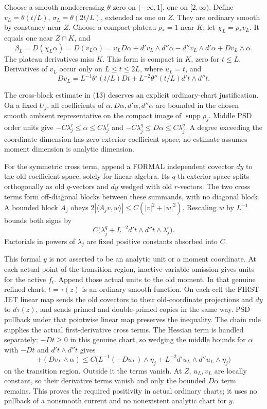 \documentclass[11pt]{article}
\begin{document}
Choose a smooth nondecreasing \(\theta\) zero on \(( -\infty,1]\), one on \([2,\infty)\). Define \(v_L=\theta(t/L)\), \(\sigma_L=\theta(2t/L)\), extended as one on \(Z\). They are ordinary smooth by constancy near \(Z\). Choose a compact plateau \(\rho_*=1\) near \(K\); let \(\chi_L=\rho_*v_L\). It equals one near \(Z\cap K\), and
\[
 \beta_L=D(\chi_L\alpha)=D(v_L\alpha)
 =v_LD\alpha+d'v_L\wedge d''\alpha-d''v_L\wedge d'\alpha
   +Dv_L\wedge\alpha.                                                   \tag{13}
\]
The plateau derivatives miss \(K\). This form is compact in \(K\), zero for \(t\leq L\). Derivatives of \(v_L\) occur only on \(L\leq t\leq2L\), where \(u_L=t\), and
\[
 Dv_L=L^{-1}\theta'(t/L)Dt+L^{-2}\theta''(t/L)d't\wedge d''t.
\]

The cross-block estimate in (13) deserves an explicit ordinary-chart justification. On a fixed \(U_j\), all coefficients of \(\alpha,D\alpha,d'\alpha,d''\alpha\) are bounded in the chosen smooth ambient representative on the compact image of \(\operatorname{supp}\rho_j\). Middle PSD order units give \(-C\lambda_j^r\leq\alpha\leq C\lambda_j^r\) and \(-C\lambda_j^q\leq D\alpha\leq C\lambda_j^q\). A degree exceeding the coordinate dimension has zero exterior coefficient space; no estimate assumes moment dimension is analytic dimension.

For the symmetric cross term, append a FORMAL independent covector \(dy\) to the old coefficient space, solely for linear algebra. Its \(q\)-th exterior space splits orthogonally as old \(q\)-vectors and \(dy\) wedged with old \(r\)-vectors. The two cross terms form off-diagonal blocks between these summands, with no diagonal block. A bounded block \(A_j\) obeys \(2|\langle A_jv,w\rangle|\leq C(|v|^2+|w|^2)\). Rescaling \(w\) by \(L^{-1}\) bounds both signs by
\[
 C\big(\lambda_j^q+L^{-2}d't\wedge d''t\wedge\lambda_j^r\big).
\]
Factorials in powers of \(\lambda_j\) are fixed positive constants absorbed into \(C\).

This formal \(y\) is not asserted to be an analytic unit or a moment coordinate. At each actual point of the transition region, inactive-variable omission gives units for the active \(f_i\). Append those actual units to the old moment. In that genuine refined chart, \(t=\tau(z)\) is an ordinary smooth function. On each cell the FIRST-JET linear map sends the old covectors to their old-coordinate projections and \(dy\) to \(d\tau(z)\), and sends primed and double-primed copies in the same way. PSD pullback under that pointwise linear map preserves the inequality. The chain rule supplies the actual first-derivative cross terms. The Hessian term is handled separately: \(-Dt\geq0\) in this genuine chart, so wedging the middle bounds for \(\alpha\) with \(-Dt\) and \(d't\wedge d''t\) gives
\[
 \pm(Dv_L\wedge\alpha)\leq
 C\big(L^{-1}(-Du_L)\wedge\eta_j
       +L^{-2}d'u_L\wedge d''u_L\wedge\eta_j\big)
\]
on the transition region. Outside it the terms vanish. At \(Z\), \(u_L,v_L\) are locally constant, so their derivative terms vanish and only the bounded \(D\alpha\) term remains. This proves the required positivity in actual ordinary charts; it uses no pullback of a nonsmooth current and no nonexistent analytic chart for \(y\).
\end{document}
